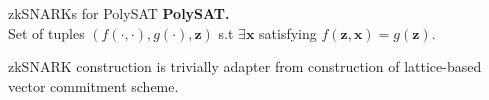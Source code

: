 \begin{frame}{zkSNARKs for PolySAT}
	\textbf{PolySAT.} \\Set of tuples $(f(\cdot, \cdot), g(\cdot), \mathbf{z})$ s.t $\exists \mathbf{x}$ satisfying $f(\mathbf{z}, \mathbf{x}) = g(\mathbf{z})$.
	
	zkSNARK construction is trivially adapter from construction of lattice-based vector commitment scheme.
\end{frame}
